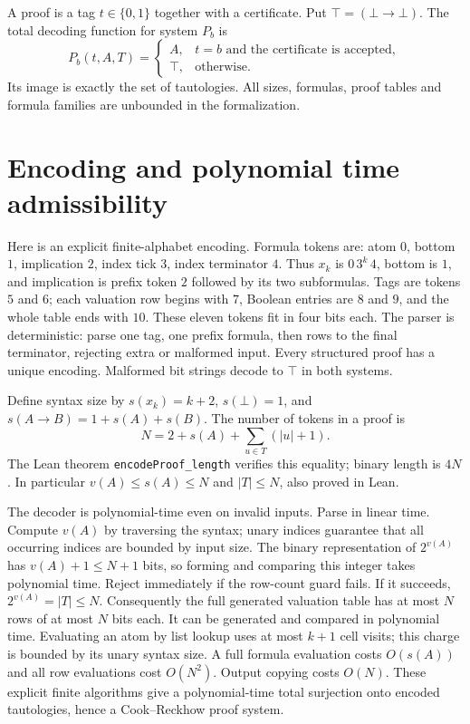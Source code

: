 \documentclass[11pt]{article}
\begin{document}
A proof is a tag $t\in\{0,1\}$ together with a certificate. Put $\top=(\bot\to\bot)$. The total decoding function for system $P_b$ is
\[
 P_b(t,A,T)=
 \begin{cases}
 A,&t=b\text{ and the certificate is accepted},\\
 \top,&\text{otherwise}.
 \end{cases}
\]
Its image is exactly the set of tautologies. All sizes, formulas, proof tables and formula families are unbounded in the formalization.

\section{Encoding and polynomial time admissibility}
Here is an explicit finite-alphabet encoding. Formula tokens are: atom $0$, bottom $1$, implication $2$, index tick $3$, index terminator $4$. Thus $x_k$ is $0\,3^k\,4$, bottom is $1$, and implication is prefix token $2$ followed by its two subformulas. Tags are tokens $5$ and $6$; each valuation row begins with $7$, Boolean entries are $8$ and $9$, and the whole table ends with $10$. These eleven tokens fit in four bits each. The parser is deterministic: parse one tag, one prefix formula, then rows to the final terminator, rejecting extra or malformed input. Every structured proof has a unique encoding. Malformed bit strings decode to $\top$ in both systems.

Define syntax size by $s(x_k)=k+2$, $s(\bot)=1$, and $s(A\to B)=1+s(A)+s(B)$. The number of tokens in a proof is
\[
       N=2+s(A)+\sum_{u\in T}(|u|+1).
\]
The Lean theorem \texttt{encodeProof\_length} verifies this equality; binary length is $4N$. In particular $v(A)\leq s(A)\leq N$ and $|T|\leq N$, also proved in Lean.

The decoder is polynomial-time even on invalid inputs. Parse in linear time. Compute $v(A)$ by traversing the syntax; unary indices guarantee that all occurring indices are bounded by input size. The binary representation of $2^{v(A)}$ has $v(A)+1\leq N+1$ bits, so forming and comparing this integer takes polynomial time. Reject immediately if the row-count guard fails. If it succeeds, $2^{v(A)}=|T|\leq N$. Consequently the full generated valuation table has at most $N$ rows of at most $N$ bits each. It can be generated and compared in polynomial time. Evaluating an atom by list lookup uses at most $k+1$ cell visits; this charge is bounded by its unary syntax size. A full formula evaluation costs $O(s(A))$ and all row evaluations cost $O(N^2)$. Output copying costs $O(N)$. These explicit finite algorithms give a polynomial-time total surjection onto encoded tautologies, hence a Cook--Reckhow proof system.
\end{document}
